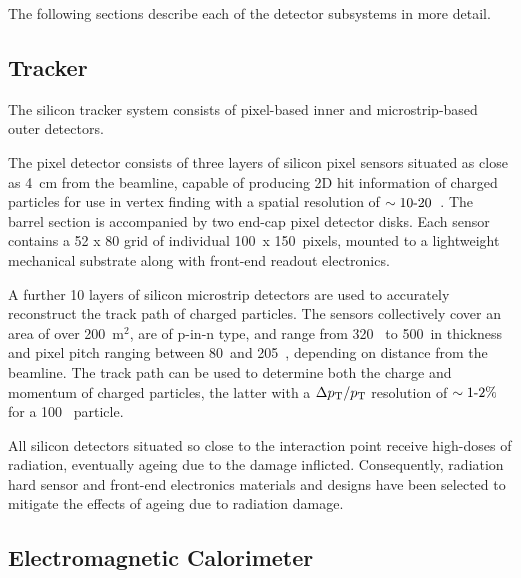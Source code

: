 The following sections describe each of the detector subsystems in more detail.

\subsection{Tracker}



The silicon tracker system consists of pixel-based inner and microstrip-based
outer detectors.

The pixel detector consists of three layers of silicon pixel sensors situated 
as close as 4~cm from the beamline, capable 
of producing 2D hit information of charged particles for use in vertex 
finding with a spatial resolution of $\sim 10 {\hbox{-}} 20$~\microm. The barrel section
is accompanied by two end-cap pixel detector
disks. Each sensor contains a 52 x 80 grid of individual 100~\microm x
150~\microm pixels,
mounted to a lightweight mechanical substrate along with front-end readout 
electronics.

A further 10 layers of silicon microstrip detectors are used to accurately 
reconstruct the track path of charged particles. The sensors collectively cover 
an area of over 200~$\text{m}^2$, are of p-in-n type, and range from 320~\microm
to 500~\microm in thickness and pixel pitch ranging between 80~\microm and 
205~\microm, depending on distance from the beamline. The track path can be used
to determine both the charge and momentum of charged particles, the latter with
a $\Delta {p_{\text T}}/{p_{\text T}}$ resolution of $\sim 1 {\hbox{-}} 2 \%$ for a 100~\gev
particle.

All silicon detectors situated so close to the interaction point receive
high-doses of radiation, eventually ageing due to the damage inflicted. Consequently, 
radiation hard sensor and front-end electronics materials and designs have been
selected to mitigate the effects of ageing due to radiation damage.

\subsection{Electromagnetic Calorimeter}

